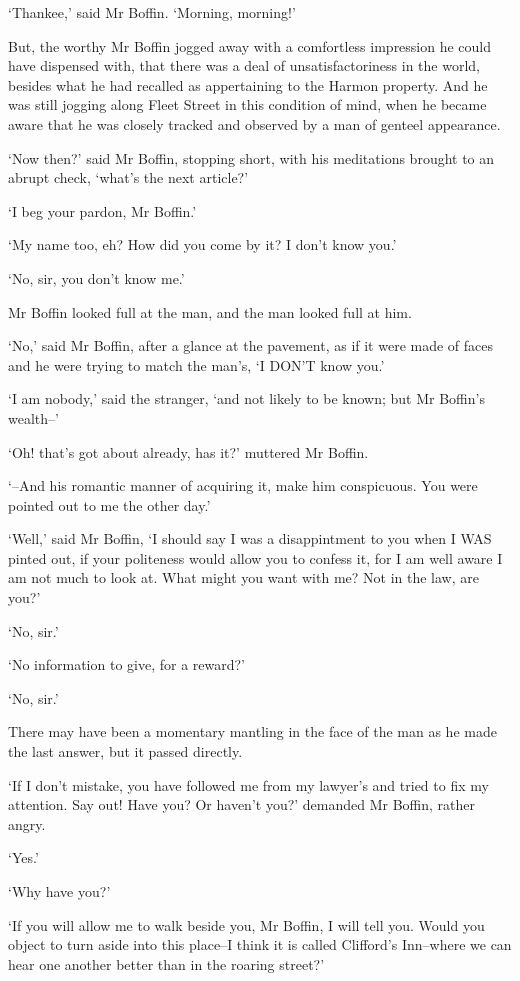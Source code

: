 ‘Thankee,’ said Mr Boffin. ‘Morning, morning!’

But, the worthy Mr Boffin jogged away with a comfortless impression he
could have dispensed with, that there was a deal of unsatisfactoriness
in the world, besides what he had recalled as appertaining to the Harmon
property. And he was still jogging along Fleet Street in this condition
of mind, when he became aware that he was closely tracked and observed
by a man of genteel appearance.

‘Now then?’ said Mr Boffin, stopping short, with his meditations brought
to an abrupt check, ‘what’s the next article?’

‘I beg your pardon, Mr Boffin.’

‘My name too, eh? How did you come by it? I don’t know you.’

‘No, sir, you don’t know me.’

Mr Boffin looked full at the man, and the man looked full at him.

‘No,’ said Mr Boffin, after a glance at the pavement, as if it were made
of faces and he were trying to match the man’s, ‘I DON’T know you.’

‘I am nobody,’ said the stranger, ‘and not likely to be known; but Mr
Boffin’s wealth--’

‘Oh! that’s got about already, has it?’ muttered Mr Boffin.

‘--And his romantic manner of acquiring it, make him conspicuous. You
were pointed out to me the other day.’

‘Well,’ said Mr Boffin, ‘I should say I was a disappintment to you when
I WAS pinted out, if your politeness would allow you to confess it, for
I am well aware I am not much to look at. What might you want with me?
Not in the law, are you?’

‘No, sir.’

‘No information to give, for a reward?’

‘No, sir.’

There may have been a momentary mantling in the face of the man as he
made the last answer, but it passed directly.

‘If I don’t mistake, you have followed me from my lawyer’s and tried
to fix my attention. Say out! Have you? Or haven’t you?’ demanded Mr
Boffin, rather angry.

‘Yes.’

‘Why have you?’

‘If you will allow me to walk beside you, Mr Boffin, I will tell you.
Would you object to turn aside into this place--I think it is called
Clifford’s Inn--where we can hear one another better than in the roaring
street?’

